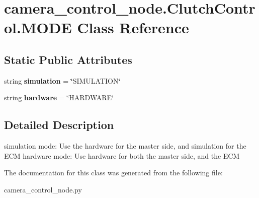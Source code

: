 \hypertarget{classcamera__control__node_1_1ClutchControl_1_1MODE}{\section{camera\-\_\-control\-\_\-node.\-Clutch\-Control.\-M\-O\-D\-E Class Reference}
\label{classcamera__control__node_1_1ClutchControl_1_1MODE}
}
\subsection*{Static Public Attributes}
\begin{DoxyCompactItemize}
\item 
\hypertarget{classcamera__control__node_1_1ClutchControl_1_1MODE_ac3d9a78ad31faaf51f1e5f25331a3ab3}{string {\bfseries simulation} = \char`\"{}S\-I\-M\-U\-L\-A\-T\-I\-O\-N\char`\"{}}\label{classcamera__control__node_1_1ClutchControl_1_1MODE_ac3d9a78ad31faaf51f1e5f25331a3ab3}

\item 
\hypertarget{classcamera__control__node_1_1ClutchControl_1_1MODE_a373a1401226244a6eb602f4aa3842f86}{string {\bfseries hardware} = \char`\"{}H\-A\-R\-D\-W\-A\-R\-E\char`\"{}}\label{classcamera__control__node_1_1ClutchControl_1_1MODE_a373a1401226244a6eb602f4aa3842f86}

\end{DoxyCompactItemize}


\subsection{Detailed Description}
\begin{DoxyVerb}    simulation mode: Use the hardware for the master side, 
            and simulation for the ECM
    hardware mode: Use hardware for both the master side,
            and the ECM
\end{DoxyVerb}
 

The documentation for this class was generated from the following file\-:\begin{DoxyCompactItemize}
\item 
camera\-\_\-control\-\_\-node.\-py\end{DoxyCompactItemize}

